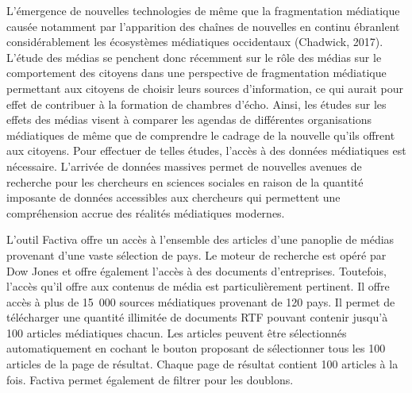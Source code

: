 \documentclass[
  letterpaper,
]{scrbook}
\begin{document}
L'émergence de nouvelles technologies de même que la fragmentation
médiatique causée notamment par l'apparition des chaînes de nouvelles en
continu ébranlent considérablement les écosystèmes médiatiques
occidentaux (Chadwick, 2017). L'étude des médias se penchent donc
récemment sur le rôle des médias sur le comportement des citoyens dans
une perspective de fragmentation médiatique permettant aux citoyens de
choisir leurs sources d'information, ce qui aurait pour effet de
contribuer à la formation de chambres d'écho. Ainsi, les études sur les
effets des médias visent à comparer les agendas de différentes
organisations médiatiques de même que de comprendre le cadrage de la
nouvelle qu'ils offrent aux citoyens. Pour effectuer de telles études,
l'accès à des données médiatiques est nécessaire. L'arrivée de données
massives permet de nouvelles avenues de recherche pour les chercheurs en
sciences sociales en raison de la quantité imposante de données
accessibles aux chercheurs qui permettent une compréhension accrue des
réalités médiatiques modernes.

L'outil Factiva offre un accès à l'ensemble des articles d'une panoplie
de médias provenant d'une vaste sélection de pays. Le moteur de
recherche est opéré par Dow Jones et offre également l'accès à des
documents d'entreprises. Toutefois, l'accès qu'il offre aux contenus de
média est particulièrement pertinent. Il offre accès à plus de 15~000
sources médiatiques provenant de 120 pays. Il permet de télécharger une
quantité illimitée de documents RTF pouvant contenir jusqu'à 100
articles médiatiques chacun. Les articles peuvent être sélectionnés
automatiquement en cochant le bouton proposant de sélectionner tous les
100 articles de la page de résultat. Chaque page de résultat contient
100 articles à la fois. Factiva permet également de filtrer pour les
doublons.
\end{document}

